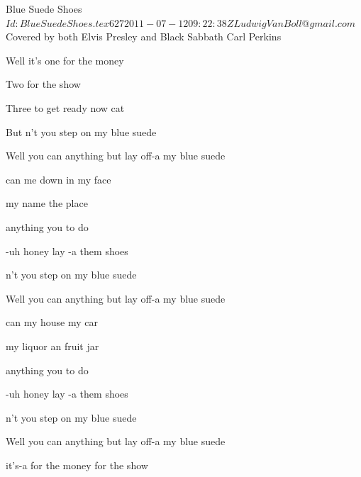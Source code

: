 \begin{SBSong}{Blue Suede Shoes}
  {$Id: BlueSuedeShoes.tex 627 2011-07-12 09:22:38Z LudwigVanBoll@gmail.com $}
  {Covered by both Elvis Presley and Black Sabbath}
  {Carl Perkins}
  \begin{SBVerse}
    Well it's one for the money  
    
    Two for the show   
    
    Three to get ready now  cat  
    
    But n't you step on my blue suede  
    
    Well you can  anything but lay off-a my blue suede  
  \end{SBVerse}
  \begin{SBVerse}
     can  me down   in my face 
    
      my name   the place 
    
      anything  you  to do 
    
     -uh honey lay -a them shoes 
    
    n't you step on my blue suede 
    
    Well you can  anything but lay off-a my blue suede 
    
         
  \end{SBVerse}
  \begin{SBVerse}
     can  my house   my car 
    
      my liquor  an  fruit jar 
    
      anything  you  to do 
    
     -uh honey lay -a them shoes 
    
    n't you step on my blue suede  
    
    Well you can  anything but lay off-a my blue suede  
    
         
  \end{SBVerse}
  \begin{SBVerse}
     it's-a  for the money   for the show 
    

\end{SBVerse}
\end{SBSong}
